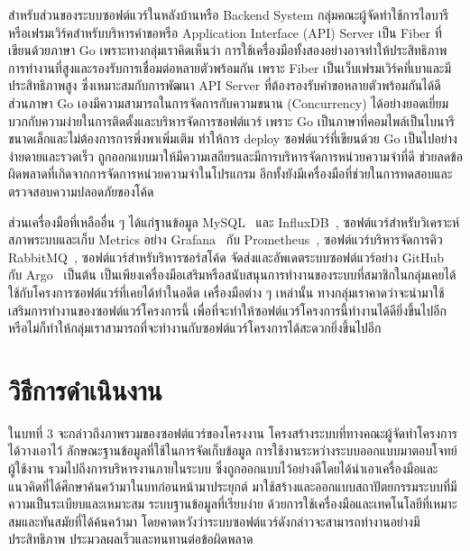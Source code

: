 \documentclass[12pt,one side,openright,a4paper]{cpe-thesis-th}
\newcommand{\thaijustify}[1]{%
  \par\hspace{30pt}\justifying
  #1
}
\begin{document}
        \thaijustify{
            สำหรับส่วนของระบบซอฟต์แวร์ในหลังบ้านหรือ Backend System กลุ่มคณะผู้จัดทำใช้การไลบารีหรือเฟรมเวิร์คสำหรับบริหารคำขอหรือ Application Interface (API) Server เป็น Fiber ที่เขียนด้วยภาษา Go เพราะทางกลุ่มเราคิดเห็นว่า การใช้เครื่องมือทั้งสองอย่างอาจทำให้ประสิทธิภาพการทำงานที่สูงและรองรับการเชื่อมต่อหลายตัวพร้อมกัน เพราะ Fiber เป็นเว็บเฟรมเวิร์คที่เบาและมีประสิทธิภาพสูง ซึ่งเหมาะสมกับการพัฒนา API Server ที่ต้องรองรับคำขอหลายตัวพร้อมกันได้ดี~\cite{gofiber, malomo20fiber} ส่วนภาษา Go เองมีความสามารถในการจัดการกับความขนาน (Concurrency) ได้อย่างยอดเยี่ยม บวกกับความง่ายในการติดตั้งและบริหารจัดการซอฟต์แวร์ เพราะ Go เป็นภาษาที่คอมไพล์เป็นไบนารีขนาดเล็กและไม่ต้องการการพึ่งพาเพิ่มเติม ทำให้การ deploy ซอฟต์แวร์ที่เขียนด้วย Go เป็นไปอย่างง่ายดายและรวดเร็ว ถูกออกแบบมาให้มีความเสถียรและมีการบริหารจัดการหน่วยความจำที่ดี ช่วยลดข้อผิดพลาดที่เกิดจากการจัดการหน่วยความจำในโปรแกรม อีกทั้งยังมีเครื่องมือที่ช่วยในการทดสอบและตรวจสอบความปลอดภัยของโค้ด~\cite{pike12go, donovan15go, pike12godev, golangorg}
        }
        \thaijustify{
            ส่วนเครื่องมือที่เหลืออื่น ๆ ได้แก่ฐานข้อมูล MySQL~\cite{mysql, mysqlcomm} และ InfluxDB~\cite{influxdb, influxdb-platforms, sandholm17influx}, ซอฟต์แวร์สำหรับวิเคราะห์สภาพระบบและเก็บ Metrics อย่าง Grafana~\cite{grafana, grafanaoss, sunil21grafana} กับ Prometheus~\cite{prometheus}, ซอฟต์แวร์บริหารจัดการคิว RabbitMQ~\cite{rabbitmq, roy17rabbitmq, hanwell17rabbitmq}, ซอฟต์แวร์สำหรับริหารซอร์สโค้ด จัดส่งและอัพเดตระบบซอฟต์แวร์อย่าง GitHub~\cite{github, githubprice,chacon14} กับ Argo~\cite{argodoc, argodocsync} เป็นต้น เป็นเพียงเครื่องมือเสริมหรือสนับสนุนการทำงานของระบบที่สมาชิกในกลุ่มเคยได้ใช้กับโครงการซอฟต์แวร์ที่เคยได้ทำในอดีต เครื่องมือต่าง ๆ เหล่านั้น ทางกลุ่มเราคาดว่าจะนำมาใช้เสริมการทำงานของซอฟต์แวร์โครงการนี้ เพื่อที่จะทำให้ซอฟต์แวร์โครงการนี้ทำงานได้ดียิ่งขึ้นไปอีกหรือไม่ก็ทำให้กลุ่มเราสามารถที่จะทำงานกับซอฟต์แวร์โครงการได้สะดวกยิ่งขึ้นไปอีก
        }
\pagebreak
\chapter{วิธีการดำเนินงาน}

\thaijustify{
    ในบทที่ 3 จะกล่าวถึงภาพรวมของซอฟต์แวร์ของโครงงาน โครงสร้างระบบที่ทางคณะผู้จัดทำโครงการได้วางเอาไว้ ลักษณะฐานข้อมูลที่ใช้ในการจัดเก็บข้อมูล การใช้งานระหว่างระบบออกแบบมาตอบโจทย์ผู้ใช้งาน รวมไปถึงการบริหารงานภายในระบบ ซึ่งถูกออกแบบไว้อย่างดีโดยได้นำเอาเครื่องมือและแนวคิดที่ได้ศึกษาค้นคว้ามาในบทก่อนหน้ามาประยุกต์ มาใช้สร้างและออกแบบสถาปัตยกรรมระบบที่มีความเป็นระเบียบและเหมาะสม ระบบฐานข้อมูลที่เรียบง่าย ด้วยการใช้เครื่องมือและเทคโนโลยีที่เหมาะสมและทันสมัยที่ได้ค้นคว้ามา โดยคาดหวังว่าระบบซอฟต์แวร์ดังกล่าวจะสามารถทำงานอย่างมีประสิทธิภาพ ประมวลผลเร็วและทนทานต่อข้อผิดพลาด
}
\end{document}
